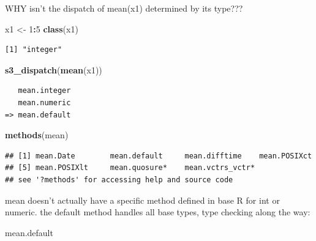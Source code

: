 \documentclass[]{book}
\newenvironment{Shaded}{\begin{snugshade}}{\end{snugshade}}
\newcommand{\DecValTok}[1]{\textcolor[rgb]{0.00,0.00,0.81}{#1}}
\newcommand{\KeywordTok}[1]{\textcolor[rgb]{0.13,0.29,0.53}{\textbf{#1}}}
\newcommand{\NormalTok}[1]{#1}
\newcommand{\OperatorTok}[1]{\textcolor[rgb]{0.81,0.36,0.00}{\textbf{#1}}}
\newcommand{\StringTok}[1]{\textcolor[rgb]{0.31,0.60,0.02}{#1}}
\begin{document}
WHY isn't the dispatch of mean(x1) determined by its type???

\begin{Shaded}
\begin{Highlighting}[]
\NormalTok{x1 <-}\StringTok{ }\DecValTok{1}\OperatorTok{:}\DecValTok{5}
\KeywordTok{class}\NormalTok{(x1)}
\end{Highlighting}
\end{Shaded}

\begin{verbatim}
[1] "integer"
\end{verbatim}

\begin{Shaded}
\begin{Highlighting}[]
\KeywordTok{s3_dispatch}\NormalTok{(}\KeywordTok{mean}\NormalTok{(x1))}
\end{Highlighting}
\end{Shaded}

\begin{verbatim}
   mean.integer
   mean.numeric
=> mean.default
\end{verbatim}

\begin{Shaded}
\begin{Highlighting}[]
\KeywordTok{methods}\NormalTok{(mean)}
\end{Highlighting}
\end{Shaded}

\begin{verbatim}
## [1] mean.Date        mean.default     mean.difftime    mean.POSIXct    
## [5] mean.POSIXlt     mean.quosure*    mean.vctrs_vctr*
## see '?methods' for accessing help and source code
\end{verbatim}

mean doesn't actually have a specific method defined in base R for int or numeric. the default method handles all base types, type checking along the way:

\begin{Shaded}
\begin{Highlighting}[]
\NormalTok{mean.default}
\end{Highlighting}
\end{Shaded}
\end{document}
